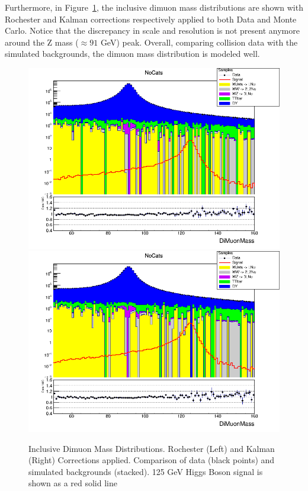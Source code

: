 Furthermore, in Figure~\ref{fig:higgs_selections_inclusivemass}, the inclusive dimuon mass distributions are shown with Rochester and Kalman corrections respectively applied to both Data and Monte Carlo. Notice that the discrepancy in scale and resolution is not present anymore around the Z mass ($\approx 91$ GeV) peak. Overall, comparing collision data with the simulated backgrounds, the dimuon mass distribution is modeled well.
\begin{figure}[htbp]
  \centering
  \includegraphics[width=0.9\linewidth]{figures/ch_higgs/distributions/baseline_rochester/distribution__NoCats__DiMuonMass__logY.png}\\
  \includegraphics[width=0.9\linewidth]{figures/ch_higgs/distributions/baseline_kalman/distribution__NoCats__DiMuonMass__logY.png}
  \caption{Inclusive Dimuon Mass Distributions. Rochester (Left) and Kalman (Right) Corrections applied. Comparison of data (black points) and simulated backgrounds (stacked). 125 GeV Higgs Boson signal is shown as a red solid line}
  \label{fig:higgs_selections_inclusivemass}
\end{figure}



